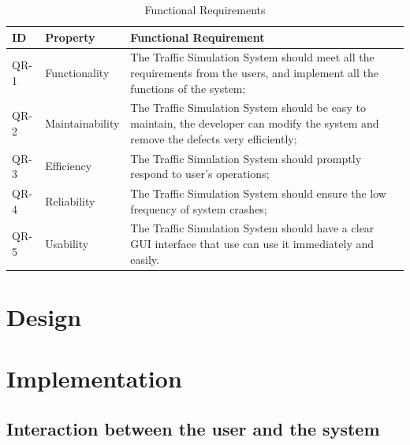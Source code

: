 \documentclass[a4paper,12pt]{article}
\begin{document}
\begin{table}[!htbp]
\centering
\label{versiontable}
\caption{Functional Requirements}
\begin{tabular}{|p{1.5cm}|p{3cm}|p{8cm}|}
\hline
ID & Property & Functional Requirement\\
\hline
QR-1& Functionality&  The Traffic Simulation System should meet all the requirements from the users, and implement all the functions of the system;\\
\hline
QR-2& Maintainability& The Traffic Simulation System should be easy to maintain, the developer can modify the system and remove the defects very efficiently;\\
\hline
QR-3& Efficiency& The Traffic Simulation System should promptly respond to user's operations;\\
\hline
QR-4& Reliability& The Traffic Simulation System should ensure the low frequency of system crashes;\\
\hline
QR-5& Usability& The Traffic Simulation System should have a clear GUI interface that use can use it immediately and easily.\\
\hline

\end{tabular}
\end{table}

\section{Design}

\section{Implementation}
\subsection{Interaction between the user and the system}
\end{document}
